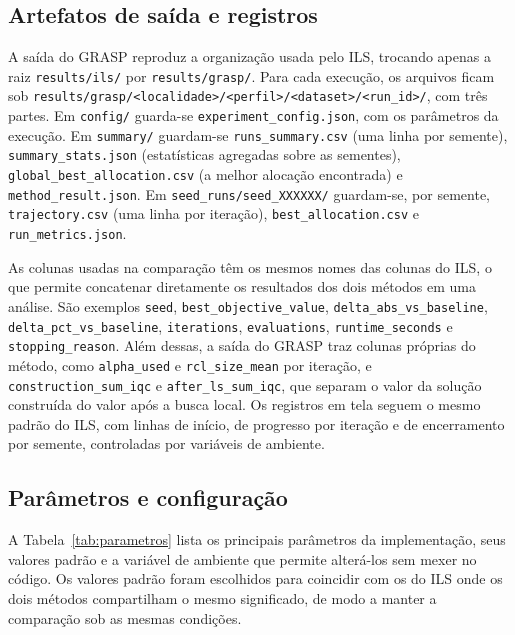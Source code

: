 \documentclass[11pt,a4paper]{article}
\newcommand{\code}[1]{\texttt{#1}}
\begin{document}
\subsection{Artefatos de saída e registros}

A saída do GRASP reproduz a organização usada pelo ILS, trocando apenas a raiz \code{results/ils/} por \code{results/grasp/}. Para cada execução, os arquivos ficam sob \code{results/grasp/<localidade>/<perfil>/<dataset>/<run\_id>/}, com três partes. Em \code{config/} guarda-se \code{experiment\_config.json}, com os parâmetros da execução. Em \code{summary/} guardam-se \code{runs\_summary.csv} (uma linha por semente), \code{summary\_stats.json} (estatísticas agregadas sobre as sementes), \code{global\_best\_allocation.csv} (a melhor alocação encontrada) e \code{method\_result.json}. Em \code{seed\_runs/seed\_XXXXXX/} guardam-se, por semente, \code{trajectory.csv} (uma linha por iteração), \code{best\_allocation.csv} e \code{run\_metrics.json}.

As colunas usadas na comparação têm os mesmos nomes das colunas do ILS, o que permite concatenar diretamente os resultados dos dois métodos em uma análise. São exemplos \code{seed}, \code{best\_objective\_value}, \code{delta\_abs\_vs\_baseline}, \code{delta\_pct\_vs\_baseline}, \code{iterations}, \code{evaluations}, \code{runtime\_seconds} e \code{stopping\_reason}. Além dessas, a saída do GRASP traz colunas próprias do método, como \code{alpha\_used} e \code{rcl\_size\_mean} por iteração, e \code{construction\_sum\_iqc} e \code{after\_ls\_sum\_iqc}, que separam o valor da solução construída do valor após a busca local. Os registros em tela seguem o mesmo padrão do ILS, com linhas de início, de progresso por iteração e de encerramento por semente, controladas por variáveis de ambiente.

\subsection{Parâmetros e configuração}

A Tabela~\ref{tab:parametros} lista os principais parâmetros da implementação, seus valores padrão e a variável de ambiente que permite alterá-los sem mexer no código. Os valores padrão foram escolhidos para coincidir com os do ILS onde os dois métodos compartilham o mesmo significado, de modo a manter a comparação sob as mesmas condições.
\end{document}
